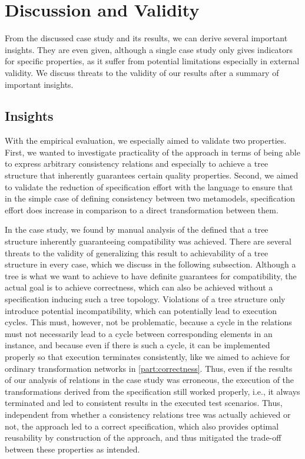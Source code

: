\section{Discussion and Validity}

From the discussed case study and its results, we can derive several important insights.
They are even given, although a single case study only gives indicators for specific properties, as it suffer from potential limitations especially in external validity.
We discuss threats to the validity of our results after a summary of important insights.

\subsection*{Insights}

With the empirical evaluation, we especially aimed to validate two properties.
First, we wanted to investigate practicality of the \commonalities approach in terms of being able to express arbitrary consistency relations and especially to achieve a tree structure that inherently guarantees certain quality properties.
Second, we aimed to validate the reduction of specification effort with the \commonalities language to ensure that in the simple case of defining consistency between two metamodels, specification effort does increase in comparison to a direct transformation between them.

In the case study, we found by manual analysis of the defined \commonalities that a tree structure inherently guaranteeing compatibility was achieved.
There are several threats to the validity of generalizing this result to achievability of a tree structure in every case, which we discuss in the following subsection.
Although a tree is what we want to achieve to have definite guarantees for compatibility, the actual goal is to achieve correctness, which can also be achieved without a specification inducing such a tree topology.
Violations of a tree structure only introduce potential incompatibility, which can potentially lead to execution cycles.
This must, however, not be problematic, because a cycle in the relations must not necessarily lead to a cycle between corresponding elements in an instance, and because even if there is such a cycle, it can be implemented properly so that execution terminates consistently, like we aimed to achieve for ordinary transformation networks in \autoref{part:correctness}.
Thus, even if the results of our analysis of relations in the case study was erroneous, the execution of the transformations derived from the \commonalities specification still worked properly, i.e., it always terminated and led to consistent results in the executed test scenarios.
Thus, independent from whether a consistency relations tree was actually achieved or not, the approach led to a correct specification, which also provides optimal reusability by construction of the \commonalities approach, and thus mitigated the trade-off between these properties as intended.

